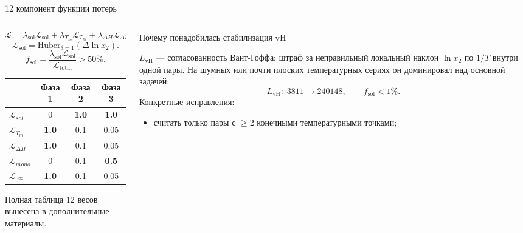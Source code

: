 \documentclass[aspectratio=169,10pt]{beamer}
\newcommand{\smallnote}[1]{{\scriptsize\color{TGSlate}#1}}
\newcommand{\tightitems}{\setlength{\itemsep}{0.25em}}
\begin{document}
\begin{frame}{12 компонент функции потерь}
  \small
  \begin{columns}[T,onlytextwidth]
    \begin{column}{0.50\textwidth}
      \[
        \mathcal{L}
        =
        \lambda_{\mathrm{sol}}\mathcal{L}_{\mathrm{sol}}
        +\lambda_{T_m}\mathcal{L}_{T_m}
        +\lambda_{\Delta H}\mathcal{L}_{\Delta H}
        +\lambda_{\gamma^\infty}\mathcal{L}_{\gamma^\infty}
        +\ldots
      \]
      \[
        \mathcal{L}_{\mathrm{sol}}
        =
        \mathrm{Huber}_{\delta=1}(\Delta\ln x_2).
      \]
      \[
        f_{\mathrm{sol}}
        =
        \frac{\lambda_{\mathrm{sol}}\mathcal{L}_{\mathrm{sol}}}{\mathcal{L}_{\mathrm{total}}}
        >50\%.
      \]
      \vspace{0.2em}
      {\scriptsize
      \centering
      \begin{tabular}{lccc}
        \toprule
        & \textbf{Фаза 1} & \textbf{Фаза 2} & \textbf{Фаза 3}\\
        \midrule
        $\mathcal{L}_{sol}$ & 0 & \textbf{1.0} & \textbf{1.0}\\
        $\mathcal{L}_{T_m}$ & \textbf{1.0} & 0.1 & 0.05\\
        $\mathcal{L}_{\Delta H}$ & \textbf{1.0} & 0.1 & 0.05\\
        $\mathcal{L}_{mono}$ & 0 & 0.1 & \textbf{0.5}\\
        $\mathcal{L}_{\gamma^\infty}$ & \textbf{1.0} & 0.1 & 0.05\\
        \bottomrule
      \end{tabular}
      \par}
      \smallnote{Полная таблица 12 весов вынесена в дополнительные материалы.}
    \end{column}
    \begin{column}{0.46\textwidth}
	      \begin{block}{Почему понадобилась стабилизация vH}
        \raggedright
        \scriptsize
	        $L_{\mathrm{vH}}$ — согласованность Вант-Гоффа: штраф за неправильный локальный наклон $\ln x_2$ по $1/T$ внутри одной пары. На шумных или почти плоских температурных сериях он доминировал над основной задачей:
        \[
          L_{\mathrm{vH}}:\;3811\to240148,\qquad f_{\mathrm{sol}}<1\%.
        \]
        Конкретные исправления:
        \begin{itemize}\tightitems
	          \item считать только пары с $\ge2$ конечными температурными точками;

\end{itemize}
\end{block}
\end{column}
\end{columns}
\end{frame}
\end{document}
